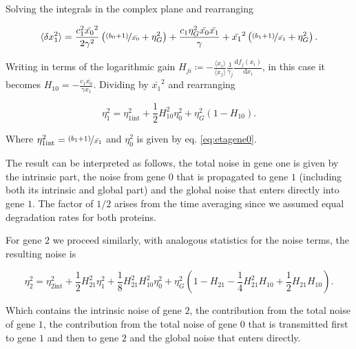 Solving the integrals in the complex plane and rearranging

\begin{equation}
  \langle \delta x_1^2\rangle = \frac{c_1^2\bar{x_0}^2}{2\gamma^2}\left(\nicefrac{(b_0+1)}{\bar{x_0}}+ \eta_G^2\right) + \frac{c_1\eta_G^2\bar{x_0}\bar{x_1}}{\gamma} + \bar{x_1}^2\left(\nicefrac{(b_1+1)}{\bar{x_1}}+\eta_G^2\right).
\end{equation}

Writing in terms of the logarithmic gain $H_{ji}\coloneqq -\frac{\langle x_i\rangle}{\langle x_j\rangle}\frac{1}{\gamma_j}\frac{\mathrm{d} f_j(x_i)}{\mathrm{d}x_i}$, in this case it becomes $H_{10}=-\frac{c_1\bar{x_0}}{\gamma x_1}$. Dividing by $\bar{x_1}^2$ and rearranging

\begin{equation}
  \label{eq:etagene1}
  \boxed{\eta_1^2 = \eta_{1\text{int}}^2 + \frac{1}{2}H_{10}^2\eta_0^2+\eta_G^2\left(1-H_{10}\right)}.
\end{equation}


Where $\eta_{1\text{int}}^2 = \nicefrac{(b_1+1)}{\bar{x_1}}$ and $\eta_0^2$ is given by eq. \ref{eq:etagene0}.

The result can be interpreted as follows, the total noise in gene one is given by the intrinsic part, the noise from gene $0$ that is propagated to gene $1$ (including both its intrinsic and global part) and the global noise that enters directly into gene $1$. The factor of $1/2$ arises from the time averaging since we assumed equal degradation rates for both proteins.


For gene $2$ we proceed similarly, with analogous statistics for the noise terms, the resulting noise is

\begin{equation}
  \label{eq:etagene2}
  \boxed{\eta_2^2 = \eta_{2\text{int}}^2 + \frac{1}{2}H_{21}^2\eta_1^2+\frac{1}{8}H_{21}^2H_{10}^2\eta_0^2+\eta_G^2\left(1-H_{21}-\frac{1}{4}H_{21}^2H_{10}+\frac{1}{2}H_{21}H_{10}\right)}.
\end{equation}

Which contains the intrinsic noise of gene $2$, the contribution from the total noise of gene $1$, the contribution from the total noise of gene $0$ that is transmitted first to gene $1$ and then to gene $2$ and the global noise that enters directly. 

